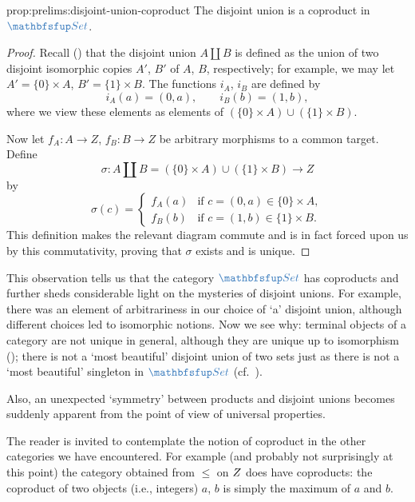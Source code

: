 \begin{prop}{}{prop:prelims:disjoint-union-coproduct}
  The disjoint union is a coproduct in $\categ{Set}$.
\end{prop}
\begin{proof}
  Recall () that the
  disjoint union $A \amalg B$ is defined as the union of two disjoint
  isomorphic copies $A'$, $B'$ of $A$, $B$, respectively; for example,
  we may let $A' = \{0\} \times A$, $B' = \{1\} \times B$. The
  functions $i_A$, $i_B$ are defined by
  \[
    i_A(a) = (0, a), \qquad i_B(b) = (1, b),
  \]
  where we view these elements as elements of
  $(\{0\} \times A) \cup (\{1\} \times B)$.

  Now let $f_A \colon A \to Z$, $f_B \colon B \to Z$ be arbitrary
  morphisms to a common target. Define
  \[
    \sigma \colon A \amalg B = (\{0\} \times A) \cup (\{1\} \times B)
    \to Z
  \]
  by
  \[
    \sigma(c) = \begin{cases} f_A(a) & \text{if } c = (0,a) \in \{0\} \times A, \\
      f_B(b) & \text{if } c = (1,b) \in \{1\} \times B. \end{cases}
  \]
  This definition makes the relevant diagram commute and is in fact
  forced upon us by this commutativity, proving that $\sigma$ exists
  and is unique.
\end{proof}
This observation tells us that the category $\categ{Set}$ has
coproducts and further sheds considerable light on the mysteries of
disjoint unions. For example, there was an element of arbitrariness in
our choice of `a' disjoint union, although different choices led to
isomorphic notions. Now we see why: terminal objects of a category are
not unique in general, although they are unique up to isomorphism
(); there is not a `most
beautiful' disjoint union of two sets just as there is not a `most
beautiful' singleton in $\categ{Set}$ (cf.\
).

Also, an unexpected `symmetry' between products and disjoint unions
becomes suddenly apparent from the point of view of universal
properties.

The reader is invited to contemplate the notion of coproduct in the
other categories we have encountered. For example (and probably not
surprisingly at this point) the category obtained from $\leq$ on $Z$
does have coproducts: the coproduct of two objects (i.e., integers)
$a$, $b$ is simply the maximum of $a$ and $b$.

